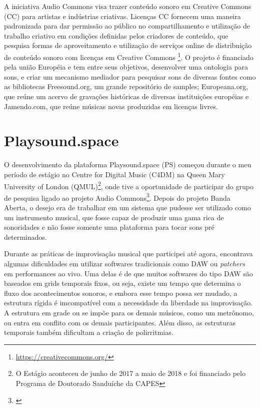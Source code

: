 

A iniciativa Audio Commons visa trazer conteúdo sonoro em Creative Commons (CC) para artistas e indústrias criativas. Licenças CC fornecem uma maneira padronizada para dar permissão ao público no compartilhamento e utilização de trabalho criativo em condições definidas pelos criadores de conteúdo, que pesquisa formas de aproveitamento e utilização de serviços online de distribuição de conteúdo sonoro com licenças em Creative Commons \footnote{\url{https://creativecommons.org/}}. O projeto é financiado pela união Européia e tem entre seus objetivos, desenvolver uma ontologia para sons, e criar um mecanismo mediador para pesquisar sons de diversas fontes como as bibliotecas Freesound.org, um grande repositório de samples; Europeana.org, que reúne um acervo de gravações históricas de diversas instituições européias e Jamendo.com, que reúne músicas novas produzidas em licenças livres.





\section{Playsound.space}
\label{ch:playsound}


O desenvolvimento da plataforma Playsound.space (PS) começou durante o meu período de estágio no Centre for Digital Music (C4DM) na Queen Mary University of London (QMUL)\footnote{O Estágio aconteceu de junho de 2017 a maio de 2018 e foi financiado pelo Programa de Doutorado Sanduíche da CAPES}, onde tive a oportunidade de participar do grupo de pesquisa ligado ao projeto Audio Commons\footnote{\cite{Font2016}}. Depois do projeto Banda Aberta, o desejo era de trabalhar em um sistema que pudesse ser utilizado como um instrumento musical, que fosse capaz de produzir uma gama rica de sonoridades e não fosse somente uma plataforma para tocar sons pré determinados. 


Durante as práticas de improvisação musical que participei até agora, encontrava algumas dificuldades em utilizar softwares tradicionais como DAW ou \emph{patchers} em performances ao vivo. Uma delas é de que muitos softwares do tipo DAW são baseados em grids temporais fixos, ou seja, existe um tempo que determina o fluxo dos acontecimentos sonoros, e embora esse tempo possa ser mudado, a estrutura rígida é imcompatível com a necessidade da liberdade na improvisação. A estrutura em grade ou se impõe para os demais músicos, como um metrônomo, ou entra em conflito com os demais participantes. Além disso, as estruturas temporais também dificultam a criação de polirritmias. 


